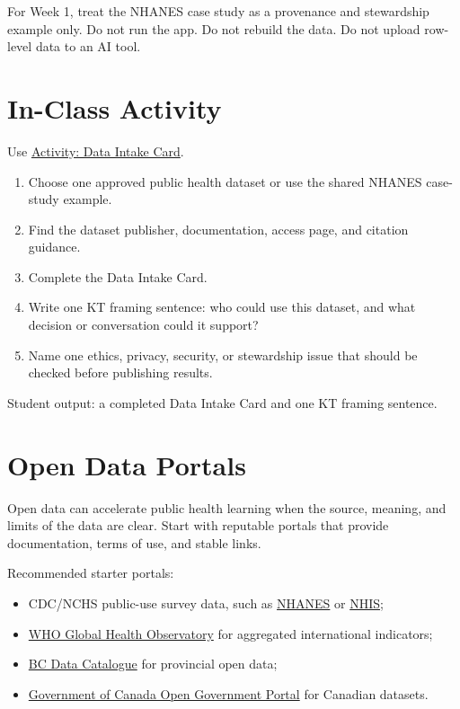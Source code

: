\documentclass[
  letterpaper,
  DIV=11,
  numbers=noendperiod,
  oneside]{scrreprt}
\providecommand{\tightlist}{%
  \setlength{\itemsep}{0pt}\setlength{\parskip}{0pt}}
\begin{document}
For Week 1, treat the NHANES case study as a provenance and stewardship
example only. Do not run the app. Do not rebuild the data. Do not upload
row-level data to an AI tool.

\section*{In-Class Activity}\label{in-class-activity}


Use \href{activity-data-intake-card.qmd}{Activity: Data Intake Card}.

\begin{enumerate}
\def\labelenumi{\arabic{enumi}.}
\tightlist
\item
  Choose one approved public health dataset or use the shared NHANES
  case-study example.
\item
  Find the dataset publisher, documentation, access page, and citation
  guidance.
\item
  Complete the Data Intake Card.
\item
  Write one KT framing sentence: who could use this dataset, and what
  decision or conversation could it support?
\item
  Name one ethics, privacy, security, or stewardship issue that should
  be checked before publishing results.
\end{enumerate}

Student output: a completed Data Intake Card and one KT framing
sentence.

\section*{Open Data Portals}\label{open-data-portals}


Open data can accelerate public health learning when the source,
meaning, and limits of the data are clear. Start with reputable portals
that provide documentation, terms of use, and stable links.

Recommended starter portals:

\begin{itemize}
\tightlist
\item
  CDC/NCHS public-use survey data, such as
  \href{../../references/data-sources/nhanes.qmd}{NHANES} or
  \href{../../references/data-sources/nhis.qmd}{NHIS};
\item
  \href{../../references/data-sources/gho.qmd}{WHO Global Health
  Observatory} for aggregated international indicators;
\item
  \href{../../references/data-sources/bc-data-catalogue.qmd}{BC Data
  Catalogue} for provincial open data;
\item
  \href{../../references/data-sources/open-portal.qmd}{Government of
  Canada Open Government Portal} for Canadian datasets.
\end{itemize}
\end{document}
